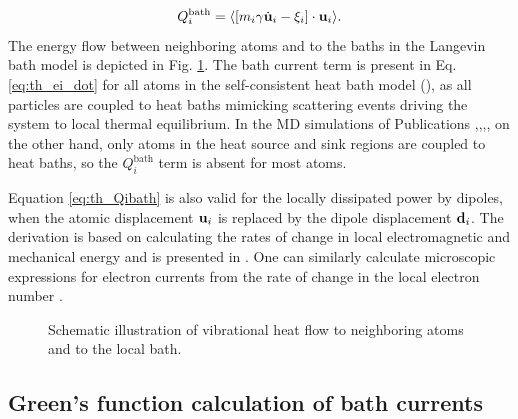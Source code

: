 \begin{equation}
 Q_i^{\textrm{bath}} = \langle [m_i\gamma \dot{\mathbf{u}}_i-\xi_i] \cdot \mathbf{u}_i \rangle. \label{eq:th_Qibath}
\end{equation}
The energy flow between neighboring atoms and to the baths in the Langevin bath model is depicted in Fig. \ref{fig:vib_currents}. The bath current term is present in Eq. \eqref{eq:th_ei_dot} for all atoms in the self-consistent heat bath model (), as all particles are coupled to heat baths mimicking scattering events driving the system to local thermal equilibrium. In the MD simulations of Publications ,,,, on the other hand, only atoms in the heat source and sink regions are coupled to heat baths, so the $Q_i^{\textrm{bath}}$ term is absent for most atoms. 

Equation \eqref{eq:th_Qibath} is also valid for the locally dissipated power by dipoles, when the atomic displacement $\mathbf{u}_i$ is replaced by the dipole displacement $\mathbf{d}_i$. The derivation is based on calculating the rates of change in local electromagnetic and mechanical energy and is presented in . One can similarly calculate microscopic expressions for electron currents from the rate of change in the local electron number \cite{roy07}. 

\begin{figure}
 \begin{center}
 \end{center}
 \caption{Schematic illustration of vibrational heat flow to neighboring atoms and to the local bath.}
 \label{fig:vib_currents}
\end{figure}


\subsection{Green's function calculation of bath currents}
\label{sec:th_bathcurrents}

